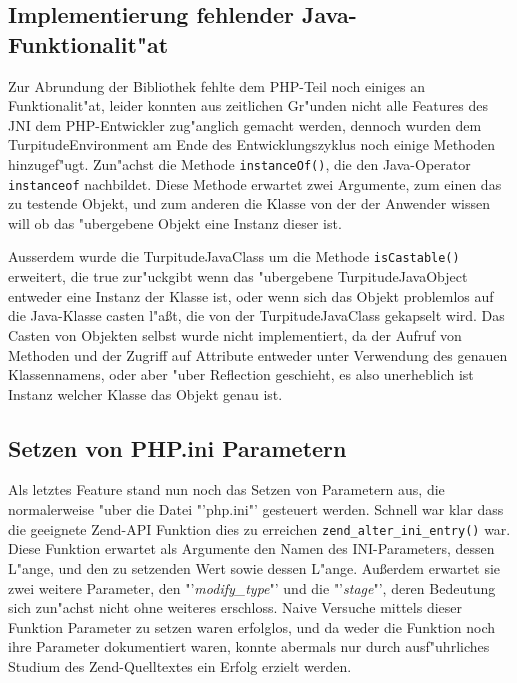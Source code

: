 \subsection{Implementierung fehlender Java-Funktionalit"at}
\label{sec:chap1:impl:14}

Zur Abrundung der Bibliothek fehlte dem PHP-Teil noch einiges an Funktionalit"at, leider konnten aus zeitlichen Gr"unden nicht alle 
Features des JNI dem PHP-Entwickler zug"anglich gemacht werden, dennoch wurden dem TurpitudeEnvironment am Ende des Entwicklungszyklus 
noch einige Methoden hinzugef"ugt. Zun"achst die Methode \texttt{instanceOf()}, die den Java-Operator \texttt{instanceof} nachbildet.
Diese Methode erwartet zwei Argumente, zum einen das zu testende Objekt, und zum anderen die Klasse von der der Anwender wissen will 
ob das "ubergebene Objekt eine Instanz dieser ist. 

Ausserdem wurde die TurpitudeJavaClass um die Methode \texttt{isCastable()} erweitert, die true zur"uckgibt wenn das "ubergebene TurpitudeJavaObject
entweder eine Instanz der Klasse ist, oder wenn sich das Objekt problemlos auf die Java-Klasse casten l"a\ss t, die von der TurpitudeJavaClass
gekapselt wird. Das Casten von Objekten selbst wurde nicht implementiert, da der Aufruf von Methoden und der Zugriff auf Attribute
entweder unter Verwendung des genauen Klassennamens, oder aber "uber Reflection geschieht, es also unerheblich ist Instanz welcher Klasse
das Objekt genau ist.

\subsection{Setzen von PHP.ini Parametern}
\label{sec:chap1:impl:15}

Als letztes Feature stand nun noch das Setzen von Parametern aus, die normalerweise "uber die Datei "'php.ini"' gesteuert werden.
Schnell war klar dass die geeignete Zend-API Funktion dies zu erreichen \texttt{zend\_alter\_ini\_entry()} war. Diese Funktion erwartet
als Argumente den Namen des INI-Parameters, dessen L"ange, und den zu setzenden Wert sowie dessen L"ange. Au\ss erdem erwartet sie zwei
weitere Parameter, den "'\emph{modify\_type}"' und die "'\emph{stage}"', deren Bedeutung sich zun"achst nicht ohne weiteres erschloss.
Naive Versuche mittels dieser Funktion Parameter zu setzen waren erfolglos, und da weder die Funktion noch ihre Parameter dokumentiert
waren, konnte abermals nur durch ausf"uhrliches Studium des Zend-Quelltextes ein Erfolg erzielt werden.

